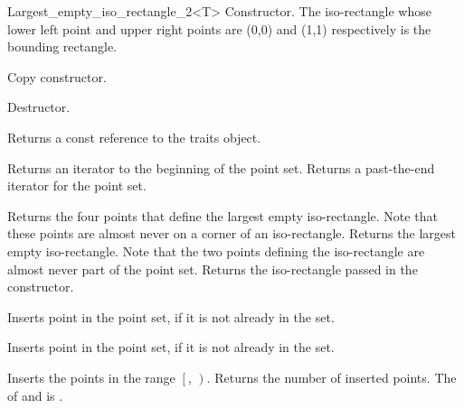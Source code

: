 \begin{ccRefClass}{Largest_empty_iso_rectangle_2<T>}
{Constructor. The iso-rectangle whose lower left point and upper right points are (0,0) 
and (1,1) respectively is the bounding rectangle.} 

{Copy constructor.} 

{Destructor.}

\ccOperations
{}


{}



\ccAccessFunctions

{Returns a const reference to the traits object.}


{Returns an iterator to the beginning of the point set.}
{Returns a past-the-end iterator for the point set.}



{Returns the four points that define the largest empty iso-rectangle.
Note that these points are almost never on a corner of an iso-rectangle.}
\ccGlue
{}
{Returns the largest empty iso-rectangle. Note that the two
points defining the iso-rectangle are almost never part of 
the point set.}
\ccGlue
{}
{Returns  the iso-rectangle passed in the constructor.}


{Inserts point  in the point set, if it is not already in the set.}

{Inserts point  in the point set, if it is not already in the set.}


{Inserts the points in the range $\left[\right.$,
$\left.\right)$.  Returns the number of inserted points.
\ccRequirements The  of  and  is .}


\end{ccRefClass}
